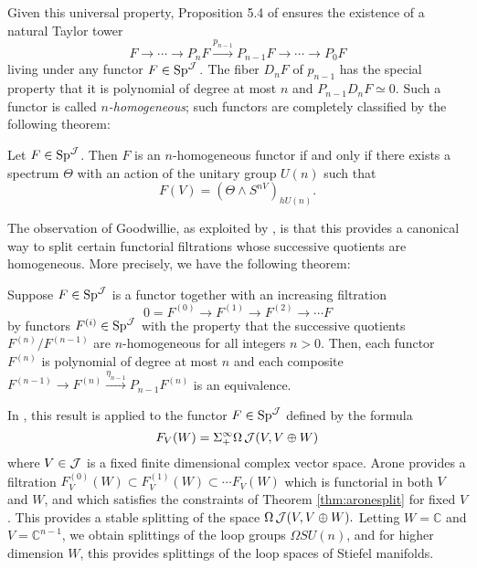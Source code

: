Given this universal property, Proposition 5.4 of \cite{Weiss} ensures the existence of a natural Taylor tower $$F \longrightarrow \cdots \longrightarrow P_{n} F \xrightarrow{p_{n-1}} P_{n-1} F \longrightarrow \cdots \longrightarrow P_0F$$ living under any functor $F\in \operatorname{\text{Sp}}^{\operatorname{\mathcal{J}}}.$  The fiber $D_n F$ of $p_{n-1}$ has the special property that it is polynomial of degree at most $n$ and $P_{n-1} D_n F \simeq 0$.  Such a functor is called \emph{$n$-homogeneous}; such functors are completely classified by the following theorem:

\begin{thm}
Let $F\in \operatorname{\text{Sp}}^{\operatorname{\mathcal{J}}}$.  Then $F$ is an $n$-homogeneous functor if and only if there exists a spectrum $\Theta$ with an action of the unitary group $U(n)$ such that $$F(V) = (\Theta \wedge S^{nV})_{hU(n)}.$$
\end{thm}


The observation of Goodwillie, as exploited by \cite{Arone}, is that this provides a canonical way to split certain functorial filtrations whose successive quotients are homogeneous.  More precisely, we have the following theorem:

\begin{thm}\label{thm:aronesplit}
Suppose $F \in \operatorname{\text{Sp}}^{\operatorname{\mathcal{J}}}$ is a functor together with an increasing filtration $$0 = F^{(0)} \longrightarrow F^{(1)}\longrightarrow F^{(2)} \longrightarrow  \cdots F$$ by functors $F^{(i)}\in \operatorname{\text{Sp}}^{\operatorname{\mathcal{J}}}$ with the property that the successive quotients $F^{(n)}/F^{(n-1)}$ are $n$-homogeneous for all integers $n>0$.  Then, each functor $F^{(n)}$ is polynomial of degree at most $n$ and each composite $F^{(n-1)} \longrightarrow F^{(n)} \xrightarrow{\eta_{n-1}} P_{n-1} F^{(n)}$ is an equivalence.
\end{thm}

In \cite{Arone}, this result is applied to the functor $F\in \operatorname{\text{Sp}}^{\operatorname{\mathcal{J}}}$ defined by the formula $$F_V(W) = \Sigma^{\infty}_+ \Omega \operatorname{\mathcal{J}}(V,V\oplus W)$$ where $V\in \operatorname{\mathcal{J}}$ is a fixed finite dimensional complex vector space.  Arone provides a filtration $F^{(0)}_V(W) \subset F^{(1)}_V(W) \subset \cdots F_V(W)$ which is functorial in both $V$ and $W$, and which satisfies the constraints of Theorem \ref{thm:aronesplit} for fixed $V$.  This provides a stable splitting of the space $\Omega \operatorname{\mathcal{J}}(V,V\oplus W).$  Letting $W=\mathbb{C}$ and $V=\mathbb{C}^{n-1}$, we obtain splittings of the loop groups $\Omega SU(n)$, and for higher dimension $W$, this provides splittings of the loop spaces of Stiefel manifolds.  


